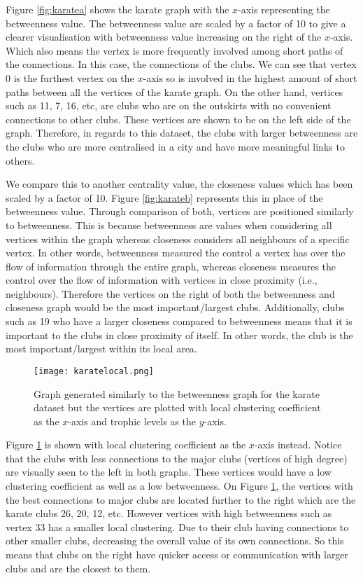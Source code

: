 Figure \ref{fig:karatea} shows the karate graph with the $x$-axis representing the betweenness value. The betweenness value are scaled by a factor of 10 to give a clearer visualisation with betweenness value increasing on the right of the $x$-axis. Which also means the vertex is more frequently involved among short paths of the connections. In this case, the connections of the clubs. We can see that vertex 0 is the furthest vertex on the $x$-axis so is involved in the highest amount of short paths between all the vertices of the karate graph. On the other hand, vertices such as 11, 7, 16, etc, are clubs who are on the outskirts with no convenient connections to other clubs. These vertices are shown to be on the left side of the graph. Therefore, in regards to this dataset, the clubs with larger betweenness are the clubs who are more centralised in a city and have more meaningful links to others.

We compare this to another centrality value, the closeness values which has been scaled by a factor of 10. Figure \ref{fig:karateb} represents this in place of the betweenness value. Through comparison of both, vertices are positioned similarly to betweenness. This is because betweenness are values when considering all vertices within the graph whereas closeness considers all neighbours of a specific vertex. In other words, betweenness measured the control a vertex has over the flow of information through the entire graph, whereas closeness measures the control over the flow of information with vertices in close proximity (i.e., neighbours). Therefore the vertices on the right of both the betweenness and closeness graph would be the most important/largest clubs. Additionally, clubs such as 19 who have a larger closeness compared to betweenness means that it is important to the clubs in close proximity of itself. In other words, the club is the most important/largest within its local area.

\begin{figure}[!htb]
	\centering
	\texttt{[image: karatelocal.png]}
	\caption{Graph generated similarly to the betweenness graph for the karate dataset but the vertices are plotted with local clustering coefficient as the $x$-axis and trophic levels as the $y$-axis.}
	\label{fig:karatelocal}
\end{figure}

Figure \ref{fig:karatelocal} is shown with local clustering coefficient as the $x$-axis instead. Notice that the clubs with less connections to the major clubs (vertices of high degree) are visually seen to the left in both graphs. These vertices would have a low clustering coefficient as well as a low betweenness. On Figure \ref{fig:karatelocal}, the vertices with the best connections to major clubs are located further to the right which are the karate clubs 26, 20, 12, etc. However vertices with high betweenness such as vertex 33 has a smaller local clustering. Due to their club having connections to other smaller clubs, decreasing the overall value of its own connections. So this means that clubs on the right have quicker access or communication with larger clubs and are the closest to them.

